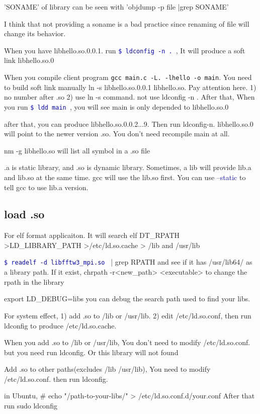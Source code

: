 \documentclass[paper=8.5in:11in, twoside, 12pt, pagesize=pdftex]{book}
\newcommand{\linuxcommand}[1]{\texttt{\textcolor{blue}{\$ #1 \Pisymbol{psy}{191}}}}
\newcommand{\op}[1]{\textcolor{blue}{-#1}}
\begin{document}
'SONAME' of library can be seen with 'objdump -p file |grep SONAME'

I think that not providing a soname is a bad practice since renaming of file will change its behavior.
		
		When you have libhello.so.0.0.1. run \linuxcommand{ldconfig -n .}, It will produce a soft link libhello.so.0
		
		When you compile client program
		\verb=gcc main.c -L. -lhello -o main=. You need to build soft link manually 
		ln -s libhello.so.0.0.1 libhello.so. Pay attention here. 1) no number after .so 2) use ln -s command. not use ldconfig -n . After that, When you run \linuxcommand{ldd main}, you will see main is only depended to libhello.so.0
		
		after that, you can produce libhello.so.0.0.2...9. Then run ldconfig-n. libhello.so.0 will point to the newer version .so. You don't need recompile main at all.  

		nm -g libhello.so will list all symbol in a .so file
		
		.a is static library, and .so is dynamic library. Sometimes, a lib will provide lib.a and lib.so at the same time. gcc will use the lib.so first. You can use \op{-static} to tell gcc to use lib.a version.

\subsection{load .so}	
	For elf format applicaiton. It will search elf DT\_RPATH >LD\_LIBRARY\_PATH >/etc/ld.so.cache > /lib and /usr/lib

	\linuxcommand{readelf -d libfftw3\_mpi.so} | grep RPATH and see if it has /usr/lib64/ as a library path. If it exist, chrpath -r<new\_path> <executable> to change the rpath in the library 

	export LD\_DEBUG=libs you can debug the search path used to find your libs.

	For system effect, 1) add .so to /lib or /usr/lib. 2) edit /etc/ld.so.conf, then run ldconfig to produce /etc/ld.so.cache.

	When you add .so to /lib or /usr/lib, You don't need to modify /etc/ld.so.conf. but you need run ldconfig.  Or this library will not found 

	Add .so to other paths(excludes /lib /usr/lib), You need to modify /etc/ld.so.conf. then run ldconfig. 
				
	in Ubuntu, \# echo "/path-to-your-libs/" > /etc/ld.so.conf.d/your.conf After that run sudo ldconfig
						
\end{document}
